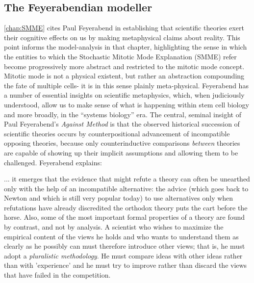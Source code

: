 \subsection{The Feyerabendian modeller}
\label{sec:Feyerabend}
\autoref{chap:SMME} cites Paul Feyerabend in establishing that scientific theories exert their cognitive effects on us by making metaphysical claims about reality. This point informs the model-analysis in that chapter, highlighting the sense in which the entities to which the Stochastic Mitotic Mode Explanation (SMME) refer become progressively more abstract and restricted to the mitotic mode concept. Mitotic mode is not a physical existent, but rather an abstraction compounding the fate of multiple cells- it is in this sense plainly meta-physical. Feyerabend has a number of essential insights on scientific metaphysics, which, when judiciously understood, allow us to make sense of what is happening within stem cell biology and more broadly, in the ``systems biology'' era. The central, seminal insight of Paul Feyerabend's \textit{Against Method} is that the observed historical succession of scientific theories occurs by counterpositional advancement of incompatible opposing theories, because only counterinductive comparisons \textit{between} theories are capable of showing up their implicit assumptions and allowing them to be challenged. Feyerabend explains:

\begin{longquote}
... it emerges that the evidence that might refute a
theory can often be unearthed only with the help of an incompatible
alternative: the advice (which goes back to Newton and which is still
very popular today) to use alternatives only when refutations have
already discredited the orthodox theory puts the cart before the
horse. Also, some of the most important formal properties of a theory
are found by contrast, and not by analysis. A scientist who wishes to
maximize the empirical content of the views he holds and who wants
to understand them as clearly as he possibly can must therefore
introduce other views; that is, he must adopt a \textit{pluralistic methodology}.
He must compare ideas with other ideas rather than with
'experience' and he must try to improve rather than discard the views
that have failed in the competition. \cite[p.20]{Feyerabend1993}
\end{longquote}

